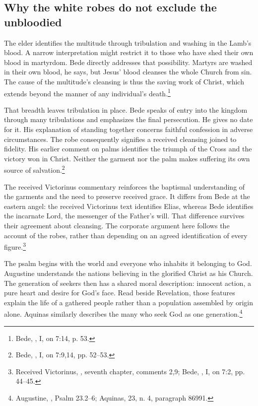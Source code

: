 \subsection{Why the white robes do not exclude the unbloodied}
The elder identifies the multitude through tribulation and washing in the Lamb's blood. A narrow interpretation might restrict it to those who have shed their own blood in martyrdom. Bede directly addresses that possibility. Martyrs are washed in their own blood, he says, but Jesus' blood cleanses the whole Church from sin. The cause of the multitude's cleansing is thus the saving work of Christ, which extends beyond the manner of any individual's death.\footnote{Bede, , I, on 7:14, p. 53.}

That breadth leaves tribulation in place. Bede speaks of entry into the kingdom through many tribulations and emphasizes the final persecution. He gives no date for it. His explanation of standing together concerns faithful confession in adverse circumstances. The robe consequently signifies a received cleansing joined to fidelity. His earlier comment on palms identifies the triumph of the Cross and the victory won in Christ. Neither the garment nor the palm makes suffering its own source of salvation.\footnote{Bede, , I, on 7:9,14, pp. 52--53.}

The received Victorinus commentary reinforces the baptismal understanding of the garments and the need to preserve received grace. It differs from Bede at the eastern angel: the received Victorinus text identifies Elias, whereas Bede identifies the incarnate Lord, the messenger of the Father's will. That difference survives their agreement about cleansing. The corporate argument here follows the account of the robes, rather than depending on an agreed identification of every figure.\footnote{Received Victorinus, , seventh chapter, comments 2,9; Bede, , I, on 7:2, pp. 44--45.}

The psalm begins with the world and everyone who inhabits it belonging to God. Augustine understands the nations believing in the glorified Christ as his Church. The generation of seekers then has a shared moral description: innocent action, a pure heart and desire for God's face. Read beside Revelation, those features explain the life of a gathered people rather than a population assembled by origin alone. Aquinas similarly describes the many who seek God as one generation.\footnote{Augustine, , Psalm 23.2--6; Aquinas,  23, n. 4, paragraph 86991.}

